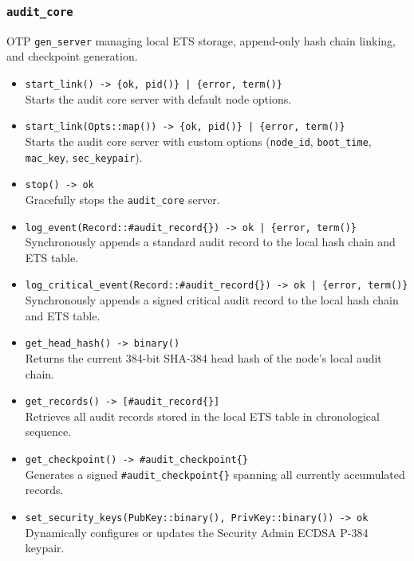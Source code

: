 \documentclass{article}
\begin{document}
\subsubsection{\texttt{audit\_core}}
OTP \texttt{gen\_server} managing local ETS storage, append-only hash chain linking, and checkpoint generation.
\begin{itemize}
    \item \texttt{start\_link() -> \{ok, pid()\} | \{error, term()\}} \\
    Starts the audit core server with default node options.
    \item \texttt{start\_link(Opts::map()) -> \{ok, pid()\} | \{error, term()\}} \\
    Starts the audit core server with custom options (\texttt{node\_id}, \texttt{boot\_time}, \texttt{mac\_key}, \texttt{sec\_keypair}).
    \item \texttt{stop() -> ok} \\
    Gracefully stops the \texttt{audit\_core} server.
    \item \texttt{log\_event(Record::\#audit\_record\{\}) -> ok | \{error, term()\}} \\
    Synchronously appends a standard audit record to the local hash chain and ETS table.
    \item \texttt{log\_critical\_event(Record::\#audit\_record\{\}) -> ok | \{error, term()\}} \\
    Synchronously appends a signed critical audit record to the local hash chain and ETS table.
    \item \texttt{get\_head\_hash() -> binary()} \\
    Returns the current 384-bit SHA-384 head hash of the node's local audit chain.
    \item \texttt{get\_records() -> [\#audit\_record\{\}]} \\
    Retrieves all audit records stored in the local ETS table in chronological sequence.
    \item \texttt{get\_checkpoint() -> \#audit\_checkpoint\{\}} \\
    Generates a signed \texttt{\#audit\_checkpoint\{\}} spanning all currently accumulated records.
    \item \texttt{set\_security\_keys(PubKey::binary(), PrivKey::binary()) -> ok} \\
    Dynamically configures or updates the Security Admin ECDSA P-384 keypair.
\end{itemize}
\end{document}
